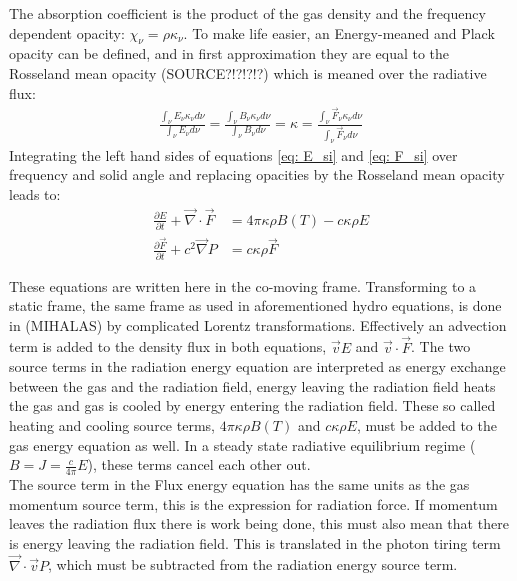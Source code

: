 The absorption coefficient is the product of the gas density and the frequency dependent opacity: $\chi_\nu = \rho \kappa_\nu$. To make life easier, an Energy-meaned and Plack opacity can be defined, and in first approximation they are equal to the Rosseland mean opacity (SOURCE?!?!?!?) which is meaned over the radiative flux:
\begin{align}
\frac{\int_\nu E_\nu \kappa_\nu d\nu}{\int_\nu E_\nu d\nu} = \frac{\int_\nu B_\nu \kappa_\nu d\nu}{\int_\nu B_\nu d\nu} = \kappa = \frac{\int_\nu \vec{F}_\nu \kappa_\nu d\nu}{\int_\nu \vec{F}_\nu d\nu}
\end{align}
Integrating the left hand sides of equations \ref{eq: E_si} and \ref{eq: F_si} over frequency and solid angle and replacing opacities by the Rosseland mean opacity leads to:
\begin{align}
\frac{\partial E}{\partial t} + \vec{\nabla} \cdot \vec{F} &= 4\pi \kappa\rho B(T) - c \kappa \rho E\\
\frac{\partial \vec{F}}{\partial t} + c^2 \vec{\nabla} P &=  c \kappa \rho \vec{F} 
\end{align}

These equations are written here in the co-moving frame. Transforming to a static frame, the same frame as used in aforementioned hydro equations, is done in \cite{} (MIHALAS) by complicated Lorentz transformations. Effectively an advection term is added to the density flux in  both equations, $\vec{v} E$ and $\vec{v} \cdot \vec{F}$. The two source terms in the radiation energy equation are interpreted as energy exchange between the gas and the radiation field, energy leaving the radiation field heats the gas and gas is cooled by energy entering the radiation field. These so called heating and cooling source terms, $4\pi \kappa\rho B(T)$ and $ c \kappa \rho E$, must be added to the gas energy equation as well. In a steady state radiative equilibrium regime ($ B = J = \frac{c}{4\pi}E$), these terms cancel each other out. \\
The source term in the Flux energy equation has the same units as the gas momentum source term, this is the expression for radiation force. If momentum leaves the radiation flux there is work being done, this must also mean that there is energy leaving the radiation field. This is translated in the photon tiring term $\vec{\nabla} \cdot \vec{v} P$, which must be subtracted from the radiation energy source term.

